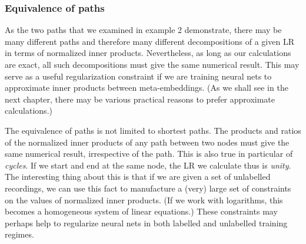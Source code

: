 \documentclass[a4paper,oneside,12pt,english]{report}
\begin{document}
\subsubsection{Equivalence of paths}
As the two paths that we examined in example 2 demonstrate, there may be many different paths and therefore many different decompositions of a given LR in terms of normalized inner products. Nevertheless, as long as our calculations are exact, all such decompositions must give the same numerical result. This may serve as a useful regularization constraint if we are training neural nets to approximate inner products between meta-embeddings. (As we shall see in the next chapter, there may be various practical reasons to prefer approximate calculations.) 

The equivalence of paths is not limited to shortest paths. The products and ratios of the normalized inner products of any path between two nodes must give the same numerical result, irrespective of the path. This is also true in particular of \emph{cycles}. If we start and end at the same node, the LR we calculate thus is \emph{unity}. The interesting thing about this is that if we are given a set of unlabelled recordings, we can use this fact to manufacture a (very) large set of constraints on the values of normalized inner products. (If we work with logarithms, this becomes a homogeneous system of linear equations.) These constraints may perhaps help to regularize neural nets in both labelled and unlabelled training regimes.      
\end{document}
